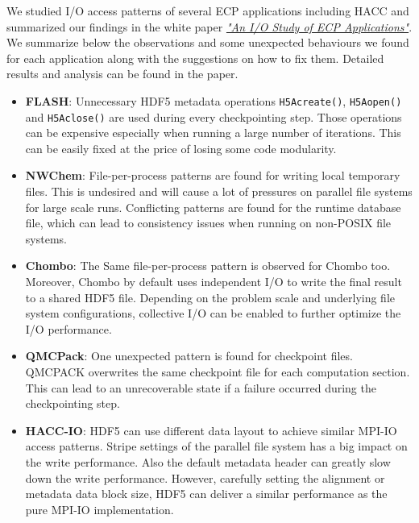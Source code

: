 We studied I/O access patterns of several ECP applications including HACC and summarized our findings in the white paper \href{http://portal.hdfgroup.org/display/HDF5/Parallel+HDF5} {\emph{"An I/O Study of ECP Applications"}}. 
We summarize below the observations and some unexpected behaviours we found for each application along with the suggestions on how to fix them. Detailed results and analysis can be found in the paper. 
\begin{itemize}
    \item \textbf{FLASH}: Unnecessary HDF5 metadata operations \texttt{H5Acreate()}, \texttt{H5Aopen()} and \texttt{H5Aclose()} are used during every checkpointing step. Those operations can be expensive especially when running a large number of iterations. This can be easily fixed at the price of losing some code modularity. 
    \item \textbf{NWChem}: File-per-process patterns are found for writing local temporary files. This is undesired and will cause a lot of pressures on parallel file systems for large scale runs. Conflicting patterns are found for the runtime database file, which can lead to consistency issues when running on non-POSIX file systems.
    \item \textbf{Chombo}: The Same file-per-process pattern is observed for Chombo too. Moreover, Chombo by default uses independent I/O to write the final result to a shared HDF5 file. Depending on the problem scale and underlying file system configurations, collective I/O can be enabled to further optimize the I/O performance.
    \item \textbf{QMCPack}: One unexpected pattern is found for checkpoint files. QMCPACK overwrites the same checkpoint file for each computation section. This can lead to an unrecoverable state if a failure occurred during the checkpointing step.
    \item \textbf{HACC-IO}: HDF5 can use different data layout to achieve similar MPI-IO access patterns. Stripe settings of the parallel file system has a big impact on the write performance. Also the default metadata header can greatly slow down the write performance. However, carefully setting the alignment or metadata data block size, HDF5 can deliver a similar performance as the pure MPI-IO implementation. 
\end{itemize}

